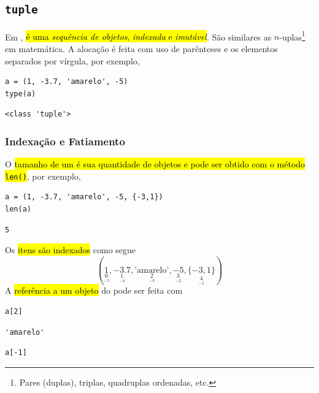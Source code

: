 \subsection{\texttt{tuple}}

Em {\python}, \hl{{\PYTHONtuple} é uma \emph{sequência de objetos}, \emph{indexada} e \emph{imutável}}. São similares as $n$-uplas\footnote{Pares (duplas), triplas, quadruplas ordenadas, etc.} em matemática. A alocação é feita com uso de parênteses e os elementos separados por vírgula, por exemplo,

\begin{lstlisting}
a = (1, -3.7, 'amarelo', -5)
type(a)
\end{lstlisting}

\begin{verbatim}
<class 'tuple'>
\end{verbatim}

\subsubsection{Indexação e Fatiamento}

O \hl{tamanho de um {\PYTHONtuple} é sua quantidade de objetos e pode ser obtido com o método \texttt{len()}}, por exemplo,

\begin{lstlisting}
a = (1, -3.7, 'amarelo', -5, {-3,1})
len(a)
\end{lstlisting}

\begin{verbatim}
5
\end{verbatim}

Os \hl{itens são indexados} como segue
\begin{equation}
  (\underset{\underset{-5}{0}}{1}, \underset{\underset{-4}{1}}{-3.7}, \underset{\underset{-3}{2}}{\text{'amarelo'}}, \underset{\underset{-2}{3}}{-5}, \underset{\underset{-1}{4}}{\{-3, 1\}})
\end{equation}
A \hl{referência a um objeto} do {\PYTHONtuple} pode ser feita com

\begin{lstlisting}
a[2]
\end{lstlisting}

\begin{verbatim}
'amarelo'
\end{verbatim}

\begin{lstlisting}
a[-1]
\end{lstlisting}

